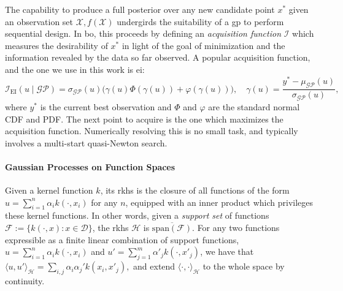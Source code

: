 \documentclass{article}
\newcommand{\D}{\mathcal{D}} %
\newcommand{\F}{\mathcal{F}}
\newcommand{\Hs}{\mathcal{H}}
\newcommand{\inner}[2]{\langle #1, #2 \rangle}
\newcommand{\acq}{\mathcal{I}}
\newcommand{\kernelH}{k}
\newcommand{\vu}{u}
\newcommand{\todo}[1]{{\color{red} TODO: #1}}
\begin{document}
The capability to produce a full posterior over any new candidate point $x^*$ given an observation set $\mathcal{X}, f(\mathcal{X})$ undergirds the suitability of a \gls{gp} to perform sequential design.
In \gls{bo}, this proceeds by defining an \emph{acquisition function} $\acq$ which measures the desirability of $x^*$ in light of the goal of minimization and the information revealed by the data so far observed.
A popular acquisition function, and the one we use in this work is \gls{ei}:
\begin{equation}
    \acq_{\textrm{EI}}(\vu \mid \mathcal{GP}) = \sigma_{\mathcal{GP}}(\vu) \!\big( \gamma(\vu) \Phi(\gamma(\vu)) + \varphi(\gamma(\vu)) \big), \quad \gamma(\vu) = \frac{y^* - \mu_{\mathcal{GP}}(\vu)}{\sigma_{\mathcal{GP}}(\vu)},
\end{equation}
where $y^*$ is the current best observation and $\Phi$ and $\varphi$ are the standard normal CDF and PDF.
The next point to acquire is the one which maximizes the acquisition function.
Numerically resolving this is no small task, and typically involves a multi-start quasi-Newton search.

\paragraph{Gaussian Processes on Function Spaces}
Given a kernel function $\kernelH$, its \gls{rkhs} is the closure of all functions of the form
$\vu = \sum_{i=1}^n \alpha_i \kernelH(\cdot, x_i)$
for any $n$, equipped with an inner product which privileges these kernel functions.
In other words, given a \textit{support set} of functions $\F:=\{\kernelH(\cdot,x) : x \in \D\}$, the \gls{rkhs} $\Hs$ is $\overline{\textrm{span}(\F)}$.
For any two functions expressible as a finite linear combination of support functions,
$\vu = \sum_{i=1}^n \alpha_i \kernelH(\cdot, x_i)$
and
$\vu' = \sum_{j=1}^m \alpha'_j \kernelH(\cdot, x'_j)$,
we have that
$
{\inner{\vu}{\vu'}_\Hs = \sum_{i,j} \alpha_i \alpha_j' \kernelH(x_i,x'_j)},
$
and extend $\langle\cdot,\cdot\rangle_{\Hs}$ to the whole space by continuity.
\end{document}
